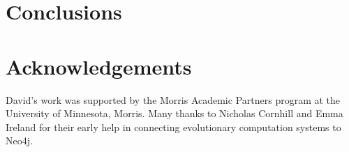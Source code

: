 \documentclass{sig-alternate}
\begin{document}
\section{Conclusions} \label{sec:conclusion}



\section*{Acknowledgements}

David's work was supported by the Morris Academic Partners program at the University of Minnesota, Morris. Many thanks to Nicholas Cornhill and Emma Ireland for their early help in connecting evolutionary computation systems to Neo4j.

\pagebreak



\end{document}
